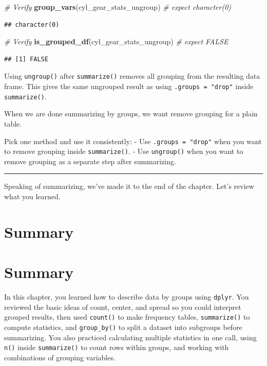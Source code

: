 \documentclass[
]{article}
\newenvironment{Shaded}{\begin{snugshade}}{\end{snugshade}}
\newcommand{\CommentTok}[1]{\textcolor[rgb]{0.56,0.35,0.01}{\textit{#1}}}
\newcommand{\FunctionTok}[1]{\textcolor[rgb]{0.13,0.29,0.53}{\textbf{#1}}}
\newcommand{\NormalTok}[1]{#1}
\begin{document}
\begin{Shaded}
\begin{Highlighting}[]
\CommentTok{\#   Verify}
\FunctionTok{group\_vars}\NormalTok{(cyl\_gear\_stats\_ungroup)  }\CommentTok{\# expect character(0)}
\end{Highlighting}
\end{Shaded}

\begin{verbatim}
## character(0)
\end{verbatim}

\begin{Shaded}
\begin{Highlighting}[]
\CommentTok{\#  Verify}
\FunctionTok{is\_grouped\_df}\NormalTok{(cyl\_gear\_stats\_ungroup) }\CommentTok{\# expect FALSE}
\end{Highlighting}
\end{Shaded}

\begin{verbatim}
## [1] FALSE
\end{verbatim}

Using \texttt{ungroup()} after \texttt{summarize()} removes all grouping
from the resulting data frame. This gives the same ungrouped result as
using \texttt{.groups\ =\ "drop"} inside \texttt{summarize()}.

When we are done summarizing by groups, we want remove grouping for a
plain table.

Pick one method and use it consistently: - Use
\texttt{.groups\ =\ "drop"} when you want to remove grouping inside
\texttt{summarize()}. - Use \texttt{ungroup()} when you want to remove
grouping as a separate step after summarizing.

\begin{center}\rule{0.5\linewidth}{0.5pt}\end{center}

Speaking of summarizing, we've made it to the end of the chapter. Let's
review what you learned.

\section{Summary}\label{summary}

\section{Summary}\label{summary-1}

In this chapter, you learned how to describe data by groups using
\texttt{dplyr}. You reviewed the basic ideas of count, center, and
spread so you could interpret grouped results, then used
\texttt{count()} to make frequency tables, \texttt{summarize()} to
compute statistics, and \texttt{group\_by()} to split a dataset into
subgroups before summarizing. You also practiced calculating multiple
statistics in one call, using \texttt{n()} inside \texttt{summarize()}
to count rows within groups, and working with combinations of grouping
variables.
\end{document}
